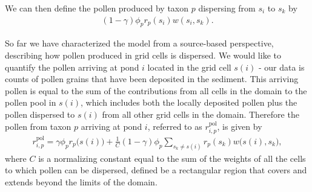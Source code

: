\documentclass[12pt]{article}
\begin{document}
We can then define the pollen produced by taxon $p$ dispersing from
$s_i$ to $s_k$ by
\begin{align}
(1-\gamma) \phi_p r_p(s_i) w(s_i, s_k).
\end{align}




So far we have characterized the model from a source-based
perspective, describing how pollen produced in grid cells is
dispersed. We would like to quantify the pollen arriving at pond $i$
located in the grid cell $s(i)$ - our data is counts of pollen grains
that have been deposited in the sediment. This arriving pollen is
equal to the sum of the contributions from all cells in the domain to
the pollen pool in $s(i)$, which includes both the locally deposited
pollen plus the pollen dispersed to $s(i)$ from all other grid cells
in the domain. Therefore the pollen from taxon $p$ arriving at pond
$i$, referred to as $r_{i,p}^{\text{pol}}$, is given by
\begin{align}
r_{i,p}^{\text{pol}} = \gamma \phi_p r_p\bigl(s(i)\bigr) + \frac{1}{C} (1-\gamma) \phi_p \sum_{s_k \neq s(i) } r_p(s_k) w\bigl(s(i), s_k\bigr),
\label{eq:arriving}
\end{align}
where $C$ is a normalizing constant equal to the sum of the weights of
all the cells to which pollen can be dispersed, defined be a
rectangular region that covers and extends beyond the limits of the
domain.
\end{document}
